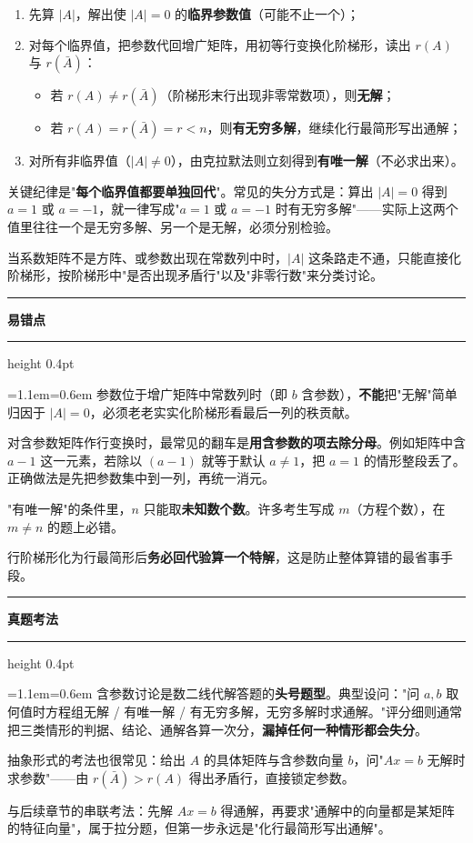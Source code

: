 \documentclass[11pt,openany,UTF8]{ctexbook}
\newcommand{\callouthead}[2]{%
  \par\addvspace{7pt}\noindent
  {\color{#1}\rule[-0.15em]{3pt}{1.05em}}\hspace{0.5em}%
  {\bfseries\color{#1}#2}\par\nobreak\vspace{-0.35em}%
  {\color{rulesep}\hrule height 0.4pt}\nobreak\vspace{0.45em}%
  \begingroup\small\setlength{\parindent}{0pt}%
  \leftskip=1.1em\rightskip=0.6em\noindent\ignorespaces}
\newcommand{\calloutend}{\par\endgroup\addvspace{7pt}}
\newenvironment{callwarn}[1]{\callouthead{warnbar}{#1}}{\calloutend}
\newenvironment{callexam}[1]{\callouthead{exambar}{#1}}{\calloutend}
\begin{document}
\begin{enumerate}
\item 先算 $\vert A\vert$，解出使 $\vert A\vert=0$ 的\textbf{临界参数值}（可能不止一个）；
\item 对每个临界值，把参数代回增广矩阵，用初等行变换化阶梯形，读出 $r(A)$ 与 $r(\bar A)$：
\begin{itemize}
\item 若 $r(A)\ne r(\bar A)$（阶梯形末行出现非零常数项），则\textbf{无解}；
\item 若 $r(A)=r(\bar A)=r<n$，则\textbf{有无穷多解}，继续化行最简形写出通解；
\end{itemize}
\item 对所有非临界值（$\vert A\vert\ne0$），由克拉默法则立刻得到\textbf{有唯一解}（不必求出来）。
\end{enumerate}
关键纪律是"\textbf{每个临界值都要单独回代}"。常见的失分方式是：算出 $\vert A\vert=0$ 得到 $a=1$ 或 $a=-1$，就一律写成"$a=1$ 或 $a=-1$ 时有无穷多解"——实际上这两个值里往往一个是无穷多解、另一个是无解，必须分别检验。

当系数矩阵不是方阵、或参数出现在常数列中时，$\vert A\vert$ 这条路走不通，只能直接化阶梯形，按阶梯形中"是否出现矛盾行"以及"非零行数"来分类讨论。

\begin{callwarn}{易错点}
参数位于增广矩阵中常数列时（即 $b$ 含参数），\textbf{不能}把"无解"简单归因于 $\vert A\vert=0$，必须老老实实化阶梯形看最后一列的秩贡献。

对含参数矩阵作行变换时，最常见的翻车是\textbf{用含参数的项去除分母}。例如矩阵中含 $a-1$ 这一元素，若除以 $(a-1)$ 就等于默认 $a\ne1$，把 $a=1$ 的情形整段丢了。正确做法是先把参数集中到一列，再统一消元。

"有唯一解"的条件里，$n$ 只能取\textbf{未知数个数}。许多考生写成 $m$（方程个数），在 $m\ne n$ 的题上必错。

行阶梯形化为行最简形后\textbf{务必回代验算一个特解}，这是防止整体算错的最省事手段。

\end{callwarn}

\begin{callexam}{真题考法}
含参数讨论是数二线代解答题的\textbf{头号题型}。典型设问："问 $a,b$ 取何值时方程组无解 / 有唯一解 / 有无穷多解，无穷多解时求通解。"评分细则通常把三类情形的判据、结论、通解各算一次分，\textbf{漏掉任何一种情形都会失分}。

抽象形式的考法也很常见：给出 $A$ 的具体矩阵与含参数向量 $b$，问"$Ax=b$ 无解时求参数"——由 $r(\bar A)>r(A)$ 得出矛盾行，直接锁定参数。

与后续章节的串联考法：先解 $Ax=b$ 得通解，再要求"通解中的向量都是某矩阵的特征向量"，属于拉分题，但第一步永远是"化行最简形写出通解"。

\end{callexam}
\end{document}
